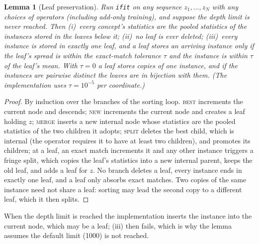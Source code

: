 \documentclass[11pt]{article}
\newtheorem{lemma}[theorem]{Lemma}
\theoremstyle{definition}
\theoremstyle{remark}
\begin{document}
\begin{lemma}[Leaf preservation]\label{lem:leaves}
Run \texttt{ifit} on any sequence $z_1,\dots,z_N$ with any choices of operators
(including add-only training), and suppose the depth limit is never reached.  Then
(i)~every concept's statistics are the pooled statistics of the instances stored in the
leaves below it; (ii)~no leaf is ever deleted; (iii)~every instance is stored in exactly
one leaf, and a leaf stores an arriving instance only if the leaf's spread is within the
exact-match tolerance $\tau$ and the instance is within $\tau$ of the leaf's mean.  With
$\tau=0$ a leaf stores copies of one instance, and if the instances are pairwise distinct
the leaves are in bijection with them.  (The implementation uses $\tau=10^{-5}$ per
coordinate.)
\end{lemma}
\begin{proof}
By induction over the branches of the sorting loop.  \textsc{best} increments the
current node and descends; \textsc{new} increments the current node and creates a leaf
holding $z$; \textsc{merge} inserts a new internal node whose statistics are the pooled
statistics of the two children it adopts; \textsc{split} deletes the best child, which is
internal (the operator requires it to have at least two children), and promotes its
children; at a leaf, an exact match increments it and any other instance triggers a
fringe split, which copies the leaf's statistics into a new internal parent, keeps the
old leaf, and adds a leaf for $z$.  No branch deletes a leaf, every instance ends in
exactly one leaf, and a leaf only absorbs exact matches.  Two copies of the same
instance need not share a leaf: sorting may lead the second copy to a different leaf,
which it then splits.
\end{proof}

When the depth limit is reached the implementation inserts the instance into the
current node, which may be a leaf; (iii) then fails, which is why the lemma assumes the
default limit (1000) is not reached.
\end{document}
